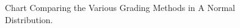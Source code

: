  \begin{figure}[!ht]
	\begin{center}
		\caption{Chart Comparing the Various Grading Methods in A Normal Distribution.}
		\label{figure-normal_distribution}
	\end{center}
\end{figure}
